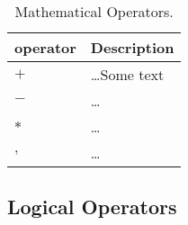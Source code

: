 \documentclass[11pt]{article}
\begin{document}
\begin{table}[ht]
  \centering
  \caption {Mathematical Operators.} \label{tab:title}
  \vspace{0.5em}
  \begin{tabular}{|m{8em}|b{25em}|}
  \hline

  \textbf{operator}
  &
  \vspace{0.7em}
  \textbf{Description} \\ [0.7em]
  \hline

  $+$
  &
  \vspace{0.7em}
  \dots Some text
  \\[0.7em]
  \hline

  $-$
  &
  \vspace{0.7em}
  \dots
  \\[0.7em]
  \hline

  $*$
  &
  \vspace{0.7em}
  \dots
  \\[0.7em]
  \hline

  $,$
  &
  \vspace{0.7em}
  \dots
  \\[0.7em]
  \hline

  \end{tabular}
\end{table}

\newpage

\subsection{Logical Operators}
\end{document}
